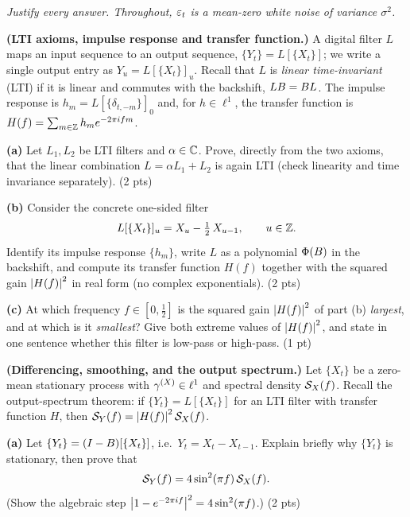 \documentclass[11pt]{article}
\newcommand{\filt}{L}
\begin{document}
\pointstable
\begin{center}\itshape Justify every answer. Throughout, $\varepsilon_t$ is a mean-zero white noise of variance $\sigma^2$.\end{center}

\textbf{(LTI axioms, impulse response and transfer function.)} A digital filter $\filt$ maps an input sequence to an output sequence, $\{Y_t\}=\filt[\{X_t\}]$; we write a single output entry as $Y_u=\filt[\{X_t\}]_u$. Recall that $\filt$ is \emph{linear time-invariant} (LTI) if it is linear and commutes with the backshift, $\filt\Bsh=\Bsh\filt$. The impulse response is $h_m=\filt[\{\delta_{t,-m}\}]_0$ and, for $h\in\ell^1$, the transfer function is $H(f)=\sum_{m\in\mathbb{Z}}h_m e^{-2\pi i fm}$.

\textbf{(a)} Let $\filt_1,\filt_2$ be LTI filters and $\alpha\in\mathbb{C}$. Prove, directly from the two axioms, that the linear combination $\filt=\alpha\filt_1+\filt_2$ is again LTI (check linearity and time invariance separately). \hfill(2 pts)

\textbf{(b)} Consider the concrete one-sided filter
\[
\filt[\{X_t\}]_u=X_u-\tfrac12\,X_{u-1},\qquad u\in\Ints .
\]
Identify its impulse response $\{h_m\}$, write $\filt$ as a polynomial $\Phi(B)$ in the backshift, and compute its transfer function $H(f)$ together with the squared gain $\left\lvert H(f) \right\rvert^2$ in real form (no complex exponentials). \hfill(2 pts)

\textbf{(c)} At which frequency $f\in[0,\tfrac12]$ is the squared gain $\left\lvert H(f) \right\rvert^2$ of part (b) \emph{largest}, and at which is it \emph{smallest}? Give both extreme values of $\left\lvert H(f) \right\rvert^2$, and state in one sentence whether this filter is low-pass or high-pass. \hfill(1 pt)
\answerpage

\textbf{(Differencing, smoothing, and the output spectrum.)} Let $\{X_t\}$ be a zero-mean stationary process with $\gamma^{(X)}\in\ell^1$ and spectral density $\mathcal{S}_X(f)$. Recall the output-spectrum theorem: if $\{Y_t\}=\filt[\{X_t\}]$ for an LTI filter with transfer function $H$, then $\mathcal{S}_Y(f)=\left\lvert H(f) \right\rvert^2\mathcal{S}_X(f)$.

\textbf{(a)} Let $\{Y_t\}=(I-B)[\{X_t\}]$, i.e.\ $Y_t=X_t-X_{t-1}$. Explain briefly why $\{Y_t\}$ is stationary, then prove that
\[
\mathcal{S}_Y(f)=4\sin^2(\pi f)\,\mathcal{S}_X(f).
\]
(Show the algebraic step $\left\lvert 1-e^{-2\pi i f} \right\rvert^2=4\sin^2(\pi f)$.) \hfill(2 pts)
\end{document}
